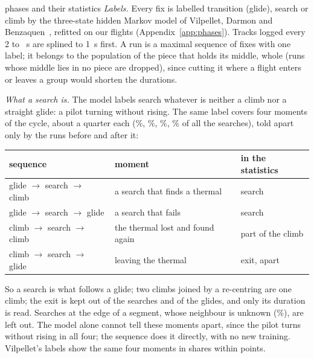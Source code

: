 \documentclass[10pt,a4paper]{article}
\begin{document}
\begin{method}{phases and their statistics}
  \emph{Labels.} Every fix is labelled transition (glide), search or climb by the three-state hidden Markov
  model of Vilpellet, Darmon and Benzaquen~\cite{vilpellet2026}, refitted on our flights
  (Appendix~\ref{app:phases}). Tracks logged every 2 to \DtMax~s are splined to 1~s first. A run is a maximal
  sequence of fixes with one label; it belongs to the population of the piece that holds its middle, whole
  (runs whose middle lies in no piece are dropped), since cutting it where a flight enters or leaves a group would shorten the durations.

  \emph{What a search is.} The model labels search whatever is neither a climb nor a straight glide: a pilot
  turning without rising. The same label covers four moments of the cycle, about a quarter each
  (\PhCtxFound\%, \PhCtxFailed\%, \PhCtxRecentre\%, \PhCtxExit\% of all the searches), told apart only by the runs
  before and after it:
  \begin{center}\footnotesize
  \begin{tabular}{@{}l l l@{}}
  \toprule
  sequence & moment & in the statistics \\
  \midrule
  glide $\to$ search $\to$ climb & a search that finds a thermal & search \\
  glide $\to$ search $\to$ glide & a search that fails & search \\
  climb $\to$ search $\to$ climb & the thermal lost and found again & part of the climb \\
  climb $\to$ search $\to$ glide & leaving the thermal & exit, apart \\
  \bottomrule
  \end{tabular}
  \end{center}
  So a search is what follows a glide; two climbs joined by a re-centring are one climb; the exit is kept out of
  the searches and of the glides, and only its duration is read. Searches at the edge of a segment, whose
  neighbour is unknown (\PhSearchDropped\%), are left out. The model alone cannot tell these moments apart,
  since the pilot turns without rising in all four; the sequence does it directly, with no new training. Vilpellet's
  labels show the same four moments in shares within \PhCtxMaxDiff{} points.


\end{method}
\end{document}
